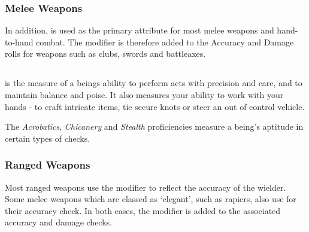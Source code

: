 \subsubsection{Melee Weapons}

In addition, \attPhys{} is used as the primary attribute for most melee weapons and hand-to-hand combat. The \attPhys{} modifier is therefore added to the Accuracy and Damage rolls for weapons such as clubs, swords and battleaxes.
\raggedbottom

\subsection{\attFin{}}

\attFin{} is the measure of a beings ability to perform acts with precision and care, and to maintain balance and poise. It also measures your ability to work with your hands - to craft intricate items, tie secure knots or steer an out of control vehicle. 

The {\it Acrobatics}, {\it Chicanery} and {\it Stealth} proficiencies measure a being's aptitude in certain types of \attFin{} checks. 




\subsubsection{Ranged Weapons}

Most ranged weapons use the \attFin{} modifier to reflect the accuracy of the wielder. Some melee weapons which are classed as `elegant', such as rapiers, also use \attFin{} for their accuracy check.  In both cases, the \attFin{} modifier is added to the associated accuracy and damage checks.


